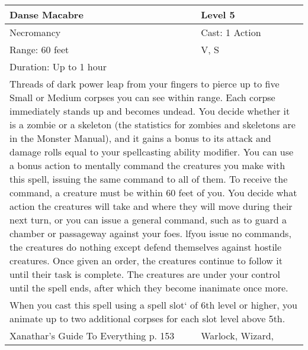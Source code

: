 \documentclass[11pt]{report}
\begin{document}
\begin{table}[H]
	\begin{tabular}{||p{6cm}|p{6cm}||}
		\hline\hline
		\bf{Danse Macabre} & Level 5\\ \hline
		Necromancy & Cast: 1 Action\\ \hline
		Range: 60 feet & V, S\\ \hline
		Duration: Up to 1 hour & \\ \hline
		\multicolumn{2}{||p{12cm}||}{Threads of dark power leap from your fingers to pierce up to five Small or Medium corpses you can see within range. Each corpse immediately stands up and becomes undead. You decide whether it is a zombie or a skeleton (the statistics for zombies and skeletons are in the Monster Manual), and it gains a bonus to its attack and damage rolls equal to your spellcasting ability modifier. You can use a bonus action to mentally command the creatures you make with this spell, issuing the same command to all of them. To receive the command, a creature must be within 60 feet of you. You decide what action the creatures will take and where they will move during their next turn, or you can issue a general command, such as to guard a chamber or passageway against your foes. lfyou issue no commands, the creatures do nothing except defend themselves against hostile creatures. Once given an order, the creatures continue to follow it until their task is complete.
The creatures are under your control until the spell ends, after which they become inanimate once more.}\\ \hline
		\multicolumn{2}{||p{12cm}||}{When you cast this spell using a spell slot‘ of 6th level or higher, you animate up to two additional corpses for each slot level above 5th.}\\ \hline
Xanathar's Guide To Everything p. 153 & Warlock, Wizard, \\ \hline\hline
	\end{tabular}
\end{table}
\end{document}
